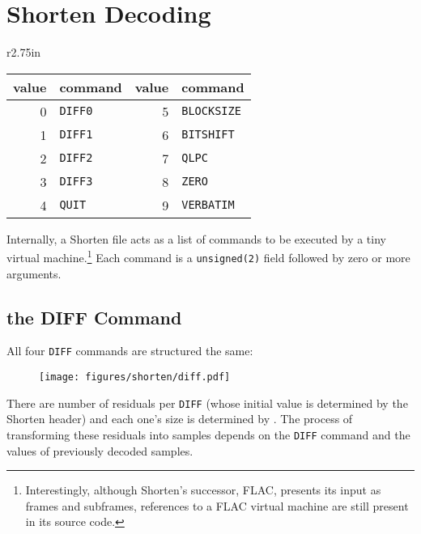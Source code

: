 \section{Shorten Decoding}
\begin{wrapfigure}[4]{r}{2.75in}
\begin{tabular}{|r|l||r|l|}
\hline
value & command & value & command \\
\hline
0 & \texttt{DIFF0} & 5 & \texttt{BLOCKSIZE} \\
1 & \texttt{DIFF1} & 6 & \texttt{BITSHIFT} \\
2 & \texttt{DIFF2} & 7 & \texttt{QLPC} \\
3 & \texttt{DIFF3} & 8 & \texttt{ZERO} \\
4 & \texttt{QUIT} & 9 & \texttt{VERBATIM} \\
\hline
\end{tabular}
\end{wrapfigure}
Internally,
a Shorten file acts as a list of commands to be executed by a tiny
virtual machine.\footnote{Interestingly, although
Shorten's successor, FLAC, presents its input as frames and subframes,
references to a FLAC virtual machine are still present in its source code.}
Each command is a \texttt{unsigned(2)} field followed by zero or more
arguments.

\subsection{the DIFF Command}
All four \texttt{DIFF} commands are structured the same:
\begin{figure}[h]
\texttt{[image: figures/shorten/diff.pdf]}
\end{figure}
\par
\noindent
There are  number of residuals per \texttt{DIFF}
(whose initial value is determined by the Shorten header)
and each one's size is determined by .
The process of transforming these residuals into samples
depends on the \texttt{DIFF} command and the values of
previously decoded samples.

